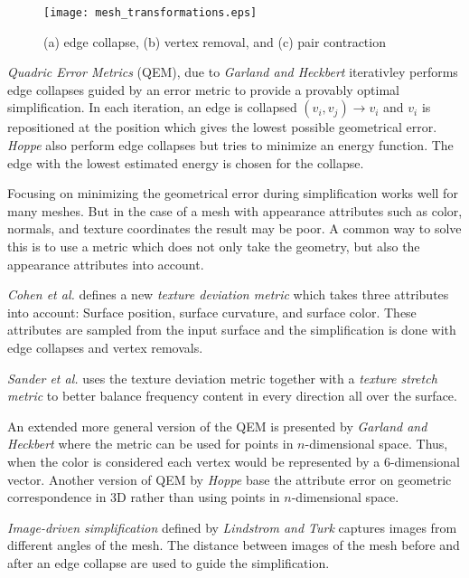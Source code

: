 \begin{figure}[ht]
    \centering
    \texttt{[image: mesh\_transformations.eps]}
    \caption[Vertex merging]{(a) edge collapse, (b) vertex removal, and (c) pair contraction}
    
    \label{fig:mesh_transformations}
\end{figure}

\emph{Quadric Error Metrics} (QEM), due to \emph{Garland and Heckbert} \cite{garland1997surface} iterativley performs edge collapses guided by an error metric to provide a provably optimal simplification. In each iteration, an edge is collapsed \((v_i, v_j) \rightarrow v_i\) and \(v_i\) is repositioned at the position which gives the lowest possible geometrical error. \emph{Hoppe} \cite{hoppe1996progressive} also perform edge collapses but tries to minimize an energy function. The edge with the lowest estimated energy is chosen for the collapse. 


Focusing on minimizing the geometrical error during simplification works well for many meshes. But in the case of a mesh with appearance attributes such as color, normals, and texture coordinates the result may be poor. A common way to solve this is to use a metric which does not only take the geometry, but also the appearance attributes into account.

\emph{Cohen et al.} \cite{cohen1998appearance} defines a new \emph{texture deviation metric} which takes three attributes into account: Surface position, surface curvature, and surface color. These attributes are sampled from the input surface and the simplification is done with edge collapses and vertex removals.

\emph{Sander et al.} \cite{sander2001texture} uses the texture deviation metric together with a \emph{texture stretch metric} to better balance frequency content in every direction all over the surface.

An extended more general version of the QEM is presented by \emph{Garland and Heckbert} \cite{garland1998simplifying} where the metric can be used for points in $n$-dimensional space. Thus, when the color is considered each vertex would be represented by a 6-dimensional vector. Another version of QEM by \emph{Hoppe} \cite{Hoppe:1999:NQM:319351.319357} base the attribute error on geometric correspondence in 3D rather than using points in $n$-dimensional space.

\emph{Image-driven simplification} defined by \emph{Lindstrom and Turk} \cite{lindstrom2000image} captures images from different angles of the mesh. The distance between images of the mesh before and after an edge collapse are used to guide the simplification.

